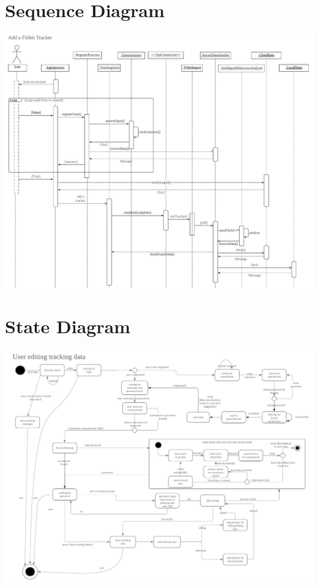 \documentclass[a4paper,11pt]{article} %
\begin{document}
\section{Sequence Diagram}
\vspace{1cm}
\begin{center}
    \includegraphics[angle=-90,width=\textwidth]{img/Sequence_Diagram.pdf}
\end{center}
\newpage

\section{State Diagram}
\begin{center}
    \includegraphics[angle=-90,width=\textwidth]{img/State_Diagram.pdf}
\end{center}
\newpage
\end{document}
